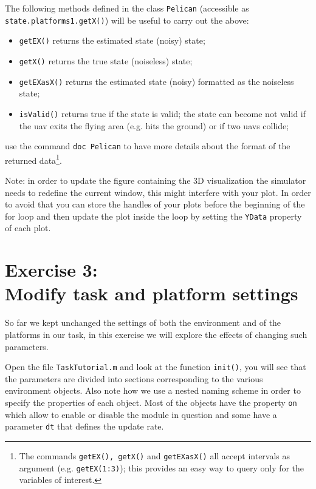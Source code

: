 \documentclass[a4paper,11pt]{article}
\begin{document}
The following methods defined in the class \texttt{Pelican} (accessible as \texttt{state.platforms{1}.getX()}) will be useful to carry out the above:
\begin{itemize}
 \item \texttt{getEX()} returns the estimated state (noisy) state;
 \item \texttt{getX()} returns the true state (noiseless) state;
 \item \texttt{getEXasX()} returns the estimated state (noisy) formatted as the noiseless state;
 \item \texttt{isValid()} returns true if the state is valid; the state can become not valid if the uav exits the flying area (e.g. hits the ground) or if two uavs collide;
\end{itemize}
use the command \texttt{doc Pelican} to have more details about the format of the returned data\footnote{The commands \texttt{getEX(), getX()} and \texttt{getEXasX()} all accept intervals as argument (e.g. \texttt{getEX(1:3)}); this provides an easy way to query only for the variables of interest.}.

Note:
in order to update the figure containing the 3D visualization the simulator needs to redefine the current window, this might interfere with your plot.
In order to avoid that you can store the handles of your plots before the beginning of the for loop and then update the plot inside the loop by setting the \texttt{YData} property of each plot.

\section*{Exercise 3:\\Modify task and platform settings}

So far we kept unchanged the settings of both the environment and of the platforms in our task, in this exercise we will explore the effects of changing such parameters.

Open the file \texttt{TaskTutorial.m} and look at the function \texttt{init()}, you will see that the parameters are divided into sections corresponding to the various environment objects. Also note how we use a nested naming scheme in order to specify the properties of each object.
Most of the objects have the property \texttt{on} which allow to enable or disable the module in question and some have a parameter \texttt{dt} that defines the update rate.
\end{document}
